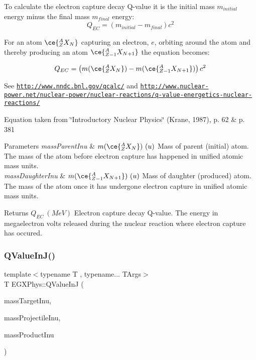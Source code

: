 To calculate the electron capture decay Q-\/value it is the initial mass $m_{initial}$ energy minus the final mass $m_{final}$ energy\+: \[Q_{EC} = \left ( m_{initial}-m_{final}\right ) c^2\]

For an atom $\ce{ ^{A}_{Z}X_{N} }$ capturing an electron, $e$, orbiting around the atom and thereby producing an atom $\ce{ ^{A}_{Z-1}X_{N{+1}} }$ the equation becomes\+:

\[Q_{EC} = \left ( m(\ce{ ^{A}_{Z}X_{N} }) - m(\ce{ ^{A}_{Z-1}X_{N{+1}} }) \right ) c^2\]

See \href{http://www.nndc.bnl.gov/qcalc/}{\tt http\+://www.\+nndc.\+bnl.\+gov/qcalc/} and \href{http://www.nuclear-power.net/nuclear-power/nuclear-reactions/q-value-energetics-nuclear-reactions/}{\tt http\+://www.\+nuclear-\/power.\+net/nuclear-\/power/nuclear-\/reactions/q-\/value-\/energetics-\/nuclear-\/reactions/}

Equation taken from \char`\"{}\+Introductory Nuclear Physics\char`\"{} (Krane, 1987), p. 62 \& p. 381


\begin{DoxyParams}{Parameters}
{\em mass\+Parent\+Inu} & $m(\ce{ ^{A}_{Z}X_{N} })\ (u)$ Mass of parent (initial) atom. The mass of the atom before electron capture has happened in unified atomic mass units. \\
\hline
{\em mass\+Daughter\+Inu} & $m(\ce{ ^{A}_{Z-1}X_{N{+1}} })\ (u)$ Mass of daughter (produced) atom. The mass of the atom once it has undergone electron capture in unified atomic mass units. \\
\hline
\end{DoxyParams}
\begin{DoxyReturn}{Returns}
$Q_{EC}\ (MeV)$ Electron capture decay Q-\/value. The energy in megaelectron volts released during the nuclear reaction where electron capture has occured. 
\end{DoxyReturn}
\mbox{\label{group___q_value_ga377e1e8298a32359ac68025fb1dd8151}} 
\subsubsection{\texorpdfstring{Q\+Value\+In\+J()}{QValueInJ()}}
{\footnotesize\ttfamily template$<$typename T , typename... T\+Args$>$ \\
T E\+G\+X\+Phys\+::\+Q\+Value\+InJ (\begin{DoxyParamCaption}\item[{const T \&}]{mass\+Target\+Inu,  }\item[{const T \&}]{mass\+Projectile\+Inu,  }\item[{const T\+Args \&...}]{mass\+Product\+Inu }\end{DoxyParamCaption})}



